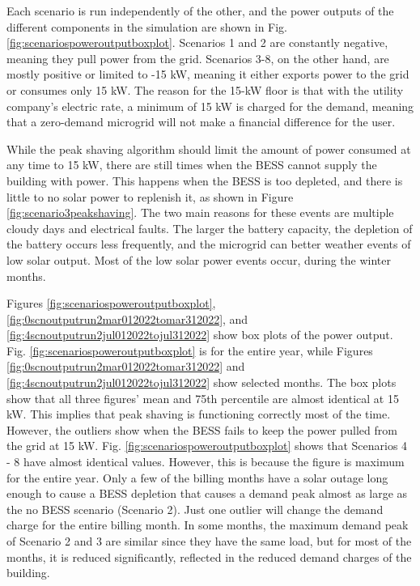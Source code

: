 \documentclass[conference]{IEEEtran}
\begin{document}
		Each scenario is run independently of the other, and the power outputs of the different components in the simulation are shown in Fig. \ref{fig:scenariospoweroutputboxplot}. Scenarios 1 and 2 are constantly negative, meaning they pull power from the grid. Scenarios 3-8, on the other hand, are mostly positive or limited to -15 kW, meaning it either exports power to the grid or consumes only 15 kW. The reason for the 15-kW floor is that with the utility company's electric rate, a minimum of 15 kW is charged for the demand, meaning that a zero-demand microgrid will not make a financial difference for the user. 
		
		While the peak shaving algorithm should limit the amount of power consumed at any time to 15 kW, there are still times when the BESS cannot supply the building with power. This happens when the BESS is too depleted, and there is little to no solar power to replenish it, as shown in Figure \ref{fig:scenario3peakshaving}. The two main reasons for these events are multiple cloudy days and electrical faults. The larger the battery capacity, the depletion of the battery occurs less frequently, and the microgrid can better weather events of low solar output. Most of the low solar power events occur, during the winter months.
		
		Figures \ref{fig:scenariospoweroutputboxplot}, \ref{fig:0scnoutputrun2mar012022tomar312022}, and \ref{fig:4scnoutputrun2jul012022tojul312022} show box plots of the power output. Fig. \ref{fig:scenariospoweroutputboxplot} is for the entire year, while Figures \ref{fig:0scnoutputrun2mar012022tomar312022} and \ref{fig:4scnoutputrun2jul012022tojul312022} show selected months. The box plots show that all three figures' mean and 75th percentile are almost identical at 15 kW. This implies that peak shaving is functioning correctly most of the time. However, the outliers show when the BESS fails to keep the power pulled from the grid at 15 kW. Fig. \ref{fig:scenariospoweroutputboxplot} shows that Scenarios 4 - 8 have almost identical values. However, this is because the figure is maximum for the entire year. Only a few of the billing months have a solar outage long enough to cause a BESS depletion that causes a demand peak almost as large as the no BESS scenario (Scenario 2). %
		Just one outlier will change the demand charge for the entire billing month. In some months, the maximum demand peak of Scenario 2 and 3 are similar since they have the same load, but for most of the months, it is reduced significantly, reflected in the reduced demand charges of the building.  \\ %
		
\end{document}
